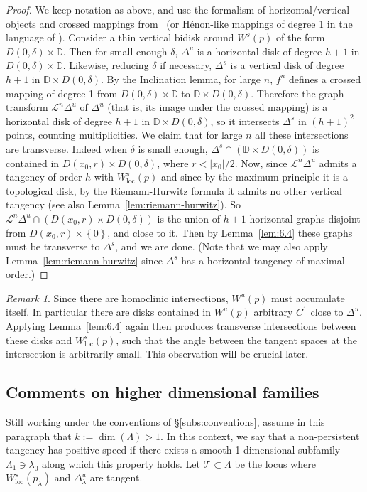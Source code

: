 \documentclass[11pt, oneside]{amsart}
\newcommand{\D}{\mathbb{D}}
\newcommand{\set}[1]{\left\{#1\right\}}
\newcommand{\abs}[1]{\left\vert#1\right\vert}
\newcommand{\el}{\mathcal{L}}
\newcommand{\la}{\lambda}
\newcommand{\loc}{{\mathrm{loc}}}
\theoremstyle{remark}
\newtheorem{rmk}[prop]{Remark}
\theoremstyle{definition}
\theoremstyle{theorem}
\newcommand{\commentaire}[1]{}
\begin{document}
 \begin{proof}
 We keep   notation as above, and use the formalism of 
 horizontal/vertical objects 
  and crossed mappings  from~\cite{HOV2} 
  (or Hénon-like mappings of degree 1 in the language of 
 \cite{henonl}).  
 Consider a thin vertical bidisk around $W^s(p)$ of the form 
 $D(0, \delta)\times \D$. Then for small enough $\delta$, $\Delta^u$ is a horizontal disk of degree $h+1$ in  $D(0, \delta)\times \D$. Likewise, reducing $\delta$ if necessary, 
  $\Delta^s$ is a vertical  disk of degree $h+1$ in  $\D\times D(0, \delta)$. 
 By the Inclination lemma, for large $n$, 
 $f^n$ defines a crossed mapping of degree 1  from  
 $D(0, \delta)\times \D$ to $\D\times D(0, \delta)$. Therefore the graph transform 
 $\el^n\Delta^u$  of $\Delta^u$ (that is, its image under the crossed mapping) is 
 a horizontal disk of degree $h+1$ in $\D\times D(0, \delta)$, so it intersects $\Delta^s$ in 
 $(h+1)^2$ points, counting multiplicities. We claim that for large $n$ all these intersections are transverse. Indeed when $\delta$ is small enough, $\Delta^s \cap (\D\times D(0, \delta))$ is contained 
 in $D(x_0, r)\times D(0, \delta)$, where $r<\abs{x_0}/2$. Now, since  $\el^n\Delta^u$ 
 admits a tangency of order $h$ with 
$W^s_\loc(p)$ and since by the maximum principle it is a topological disk, by the 
Riemann-Hurwitz formula it admits no other vertical tangency (see also Lemma~\ref{lem:riemann-hurwitz}).  So 
$\el^n\Delta^u\cap (D(x_0, r)\times D(0, \delta))$ is the union of $h+1$ horizontal graphs disjoint from 
$D(x_0, r)\times \set{0}$, and close to it. Then by Lemma~\ref{lem:6.4} these graphs must be transverse to $\Delta^s$, and we are done. (Note that we may also apply Lemma~\ref{lem:riemann-hurwitz} since $\Delta^s$ has a horizontal tangency of maximal order.)  
 \end{proof}
 
\begin{rmk}\label{rmk:near_tangencies}
Since there are homoclinic intersections, 
$W^u(p)$ must accumulate itself. In particular there are disks   contained in  $W^u(p)$ arbitrary $C^1$ close to $\Delta^u$. Applying Lemma~\ref{lem:6.4} again then produces transverse 
intersections between these disks and $W^s_\loc(p)$, such that the angle 
between the tangent spaces at the intersection  is arbitrarily small. This observation will be crucial later. 
\end{rmk}

\subsection{Comments on higher dimensional families}  \label{subs:comments_higherdim}
Still working under  the conventions of \S\ref{subs:conventions}, assume in this paragraph   
 that $k:=\dim(\Lambda)>1$. In this context, we say that a non-persistent tangency has positive speed 
 if there exists a smooth 1-dimensional subfamily
 $\Lambda_1\ni\la_0$ along which this property holds.
 Let $\mathcal{T}\subset \Lambda$ be the   locus  where
 $W^s_\loc(p_\la)$ and $\Delta^u_\lambda$ are tangent. \commentaire{We add a formal statement here for Exposition Rmk \#3}
\end{document}
